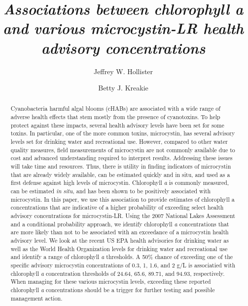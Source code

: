\documentclass[10pt,a4paper,twocolumn]{article}
\begin{document}
\title{\textit{Associations between chlorophyll \emph{a} and various microcystin-LR
health advisory concentrations} }
\author[1]{Jeffrey W. Hollister}
\author[1]{Betty J. Kreakie}

\maketitle
\thispagestyle{fancy}

\begin{abstract}

Cyanobacteria harmful algal blooms (cHABs) are associated with a wide
range of adverse health effects that stem mostly from the presence of
cyanotoxins. To help protect against these impacts, several health
advisory levels have been set for some toxins. In particular, one of the
more common toxins, microcystin, has several advisory levels set for
drinking water and recreational use. However, compared to other water
quality measures, field measurements of microcystin are not commonly
available due to cost and advanced understanding required to interpret
results. Addressing these issues will take time and resources. Thus,
there is utility in finding indicators of microcystin that are already
widely available, can be estimated quickly and in situ, and used as a
first defense against high levels of microcystin. Chlorophyll \emph{a}
is commonly measured, can be estimated \emph{in situ}, and has been
shown to be positively associated with microcystin. In this paper, we
use this association to provide estimates of chlorophyll a
concentrations that are indicative of a higher probability of exceeding
select health advisory concentrations for microcystin-LR. Using the 2007
National Lakes Assessment and a conditional probability approach, we
identify chlorophyll \emph{a} concentrations that are more likely than
not to be associated with an exceedance of a microcystin health advisory
level. We look at the recent US EPA health advisories for drinking water
as well as the World Health Organization levels for drinking water and
recreational use and identify a range of chlorophyll \emph{a}
thresholds. A 50\% chance of exceeding one of the specific advisory
microcystin concentrations of 0.3, 1, 1.6, and 2 g/L is associatied with
chlorophyll \emph{a} concentration thresholds of 24.64, 65.6, 89.71, and
94.93, respectively. When managing for these various microcystin levels,
exceeding these reported chlorophyll \emph{a} concentrations should be a
trigger for further testing and possible management action.

\end{abstract}
\end{document}
